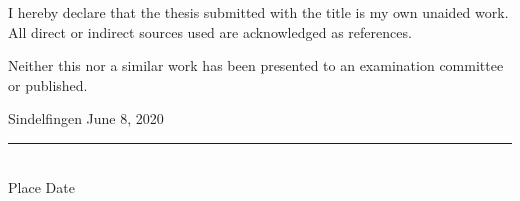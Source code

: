 I hereby declare that the thesis submitted with the title \textit{\@title} is my own unaided work. All direct or indirect sources used are acknowledged as references.

Neither this nor a similar work has been presented to an examination committee or published.

\vspace{4em}

Sindelfingen
\hspace{1.3cm}
June 8, 2020
\vspace{-0.4cm}
\\
\rule{15cm}{0.4pt}\\
Place
\hspace{2.5cm}
Date
\hspace{4.5cm}
\@author